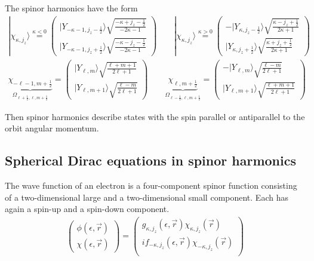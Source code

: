\documentclass[11pt,a4paper]{report}
\begin{document}
The spinor harmonics have the form
\begin{eqnarray}
|\chi_{\kappa,j_z}\rangle
\stackrel{\kappa<0}{=}\left(
\begin{array}{c}
|Y_{-\kappa-1,j_z-\frac{1}{2}}\rangle
\sqrt{\frac{-\kappa+j_z-\frac{1}{2}}{-2\kappa-1}}\\
|Y_{-\kappa-1,j_z+\frac{1}{2}}\rangle
\sqrt{\frac{-\kappa-j_z-\frac{1}{2}}{-2\kappa-1}}\end{array}\right)
\qquad
|\chi_{\kappa,j_z}\rangle
\stackrel{\kappa>0}{=}\left(
\begin{array}{c}
-|Y_{\kappa,j_z-\frac{1}{2}}\rangle
\sqrt{\frac{\kappa-j_z+\frac{1}{2}}{2\kappa+1}}\\
|Y_{\kappa,j_z+\frac{1}{2}}\rangle
\sqrt{\frac{\kappa+j_z+\frac{1}{2}}{2\kappa+1}}\end{array}\right)
\label{eq:spinorharmonicskappa_a}
\\
\underbrace{\chi_{-\ell-1,m+\frac{1}{2}}}_{\Omega_{\ell+\frac{1}{2},\ell,m+\frac{1}{2}}}
=\left(
\begin{array}{c}
|Y_{\ell,m}\rangle\sqrt{\frac{\ell+m+1}{2\ell+1}}\\
|Y_{\ell,m+1}\rangle\sqrt{\frac{\ell-m}{2\ell+1}}\end{array}\right)
\qquad
\underbrace{\chi_{\ell,m+\frac{1}{2}}}_{\Omega_{\ell-\frac{1}{2},\ell,m+\frac{1}{2}}}
=\left(
\begin{array}{c}
-|Y_{\ell,m}\rangle\sqrt{\frac{\ell-m}{2\ell+1}}\\
|Y_{\ell,m+1}\rangle\sqrt{\frac{\ell+m+1}{2\ell+1}}\end{array}\right)
\label{eq:spinorharmonicskappa}
\end{eqnarray}

Then spinor harmonics describe states with the spin parallel or
antiparallel to the orbit angular momentum.

\subsection{Spherical Dirac equations in spinor harmonics}
The wave function of an electron is a four-component spinor function
consisting of a two-dimensional large and a two-dimensional small
component. Each has again a spin-up and a spin-down component.
\begin{eqnarray}
\left(\begin{array}{c}\phi(\epsilon,\vec{r})\\\chi(\epsilon,\vec{r})
\end{array}\right) =
\left(\begin{array}{c}g_{\kappa,j_z}(\epsilon,\vec{r})
\chi_{\kappa,j_z}(\vec{r})\\ if_{-\kappa,j_z}(\epsilon,\vec{r})
\chi_{-\kappa,j_z}(\vec{r})\\ \end{array}\right) 
\end{eqnarray} 
\end{document}
